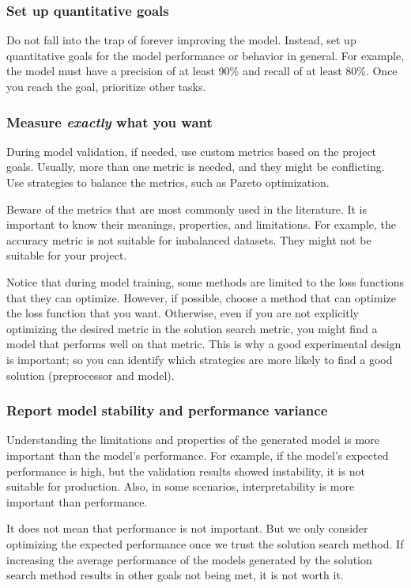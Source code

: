 \subsubsection{Set up quantitative goals}

Do not fall into the trap of forever improving the model. Instead, set up quantitative goals
for the model performance or behavior in general.  For example, the model must have a
precision of at least 90\% and recall of at least 80\%.  Once you reach the goal,
prioritize other tasks.

\subsubsection{Measure \emph{exactly} what you want}

During model validation, if needed, use custom metrics based on the project goals.
Usually, more than one metric is needed, and they might be conflicting.  Use strategies to
balance the metrics, such as Pareto optimization.

Beware of the metrics that are most commonly used in the literature.  It is important to know
their meanings, properties, and limitations.  For example, the accuracy metric is not suitable
for imbalanced datasets.  They might not be suitable for your project.

Notice that during model training, some methods are limited to the loss functions that
they can optimize.  However, if possible, choose a method that can optimize the loss
function that you want.  Otherwise, even if you are not explicitly optimizing the desired
metric in the solution search metric, you might find a model that performs well on that
metric.  This is why a good experimental design is important; so you can identify which
strategies are more likely to find a good solution (\gls{preprocessor} and model).

\subsubsection{Report model stability and performance variance}

Understanding the limitations and properties of the generated model is more important
than the model's performance.  For example, if the model's expected performance is high, but
the validation results showed instability, it is not suitable for production.  Also, in
some scenarios, interpretability is more important than performance.

It does not mean that performance is not important.  But we only consider optimizing the
expected performance once we trust the solution search method.  If increasing the average
performance of the models generated by the solution search method results in other goals not
being met, it is not worth it.

